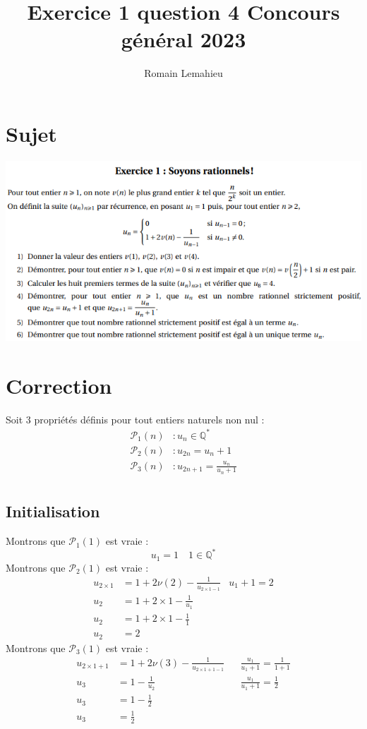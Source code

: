 \documentclass{exam}
\title{Exercice 1 question 4 Concours général 2023}
\author{Romain Lemahieu}
\newcommand*{\p}{\mathcal{P}}
\newcommand*{\QS}{\mathbb{Q}^*}
\begin{document}
\maketitle
\section{Sujet}
\includegraphics{sujet.png}
\section{Correction}
Soit 3 propriétés définis pour tout entiers naturels non nul :
\begin{align*}
\p_1(n)&:u_n \in \QS \\
\p_2(n)&:u_{2n}=u_n+1\\
\p_3(n)&:u_{2n+1}=\frac{u_n}{u_n+1}\\
\end{align*}
\pagebreak
\subsection{Initialisation}
Montrons que $\p_1(1)$ est vraie :
$$
u_1=1 
\quad 
1 \in \QS 
$$
Montrons que $\p_2(1)$ est vraie :
\begin{align*}
u_{2\times1}&=1+2\nu(2)-\frac{1}{u_{2\times1-1}}
&u_1+1=2
\\
u_2&=1+2\times1-\frac{1}{u_1}\\
u_2&=1+2\times1-\frac{1}{1}\\
u_2&=2
\end{align*}
Montrons que $\p_3(1)$ est vraie :
\begin{align*}
u_{2\times1+1}&=1+2\nu(3)-\frac{1}{u_{2\times1+1-1}}
&&
\frac{u_1}{u_1+1}=\frac{1}{1+1}
\\
u_3&=1-\frac{1}{u_2}
&&
\frac{u_1}{u_1+1}=\frac{1}{2}
\\
u_3&=1-\frac{1}{2}
\\
u_3&=\frac{1}{2}
\\
\end{align*}
\end{document}
